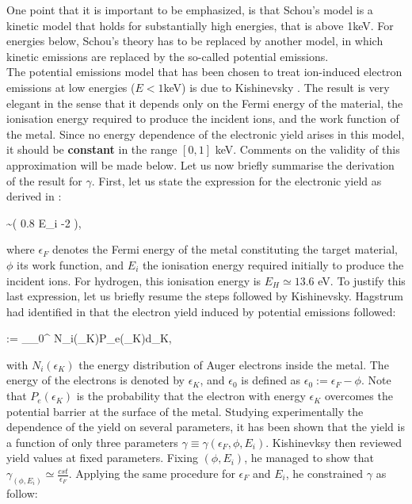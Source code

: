 \noindent One point that it is important to be emphasized, is that Schou's model is a kinetic model that holds for substantially high energies, that is above 1keV. For energies below, Schou's theory has to be replaced by another model, in which kinetic emissions are replaced by the so-called potential emissions.\\

The potential emissions model that has been chosen to treat ion-induced electron emissions at low energies ($E<1$keV) is due to Kishinevsky \cite{kishi73}. The result is very elegant in the sense that it depends only on the Fermi energy of the material, the ionisation energy required to produce the incident ions, and the work function of the metal. Since no energy dependence of the electronic yield arises in this model, it should be \textbf{constant} in the range $[0,1]$ keV. Comments on the validity of this approximation will be made below. Let us now briefly summarise the derivation of the result for $\gamma$. First, let us state the expression for the electronic yield as derived in \cite{kishi73}: 

\beq
\gamma \sim {}\big( 0.8 \cdot E_i -2 \phi \big),\label{pot_em}
\eeq

\noindent where $\epsilon_F$ denotes the Fermi energy of the metal constituting the target material, $\phi$ its work function, and $E_i$ the ionisation energy required initially to produce the incident ions. For hydrogen, this ionisation energy is $E_H \simeq 13.6$ eV. To justify this last expression, let us briefly resume the steps followed by Kishinevsky. Hagstrum had identified in \cite{Hagstrum} that the electron yield induced by potential emissions followed: 

\beq
\gamma := \int_{\epsilon_0}^{\infty} N_i(\epsilon_K)P_e(\epsilon_K)d\epsilon_K,
\eeq

\noindent with $N_i(\epsilon_K)$ the energy distribution of Auger electrons inside the metal. The energy of the electrons is denoted by $\epsilon_K$, and $\epsilon_0$ is defined as $\epsilon_0:=\epsilon_F-\phi$. Note that $P_e(\epsilon_K)$ is the probability that the electron with energy $\epsilon_K$ overcomes the potential barrier at the surface of the metal. Studying experimentally the dependence of the yield on several parameters, it has been shown that the yield is a function of only three parameters $\gamma \equiv \gamma(\epsilon_F, \phi, E_i)$. Kishinevksy then reviewed yield values at fixed parameters. Fixing $(\phi, E_i)$, he managed to show that $\gamma_{(\phi,E_i)} \simeq \frac{cst}{\epsilon_F}$. Applying the same procedure for $\epsilon_F$ and $E_i$, he constrained $\gamma$ as follow: 

